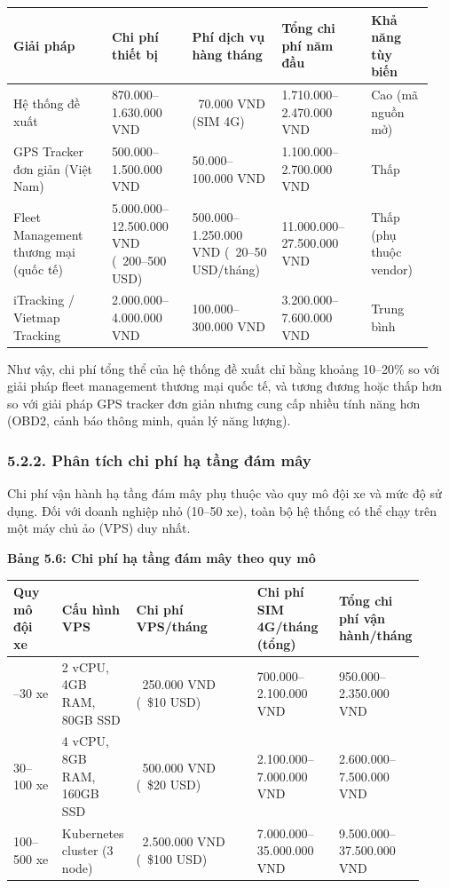 \documentclass[13pt,a4paper]{extarticle}
\newcounter{none} %
\newcommand{\thesislongtableorignewline}{}
\let\thesislongtableorignewline\\
\renewcommand{\\}{\thesislongtableorignewline\hline}%
\let\\\thesislongtableorignewline
\newcommand{\thesistabletitle}[1]{%
  \begin{center}\textbf{#1}\end{center}%
}
\begin{document}
{\def\LTcaptype{none} %
\begin{longtable}{|p{0.22\linewidth}|p{0.18\linewidth}|p{0.20\linewidth}|p{0.20\linewidth}|p{0.14\linewidth}|}
\hline \textbf{Giải pháp} & \textbf{Chi phí thiết bị} & \textbf{Phí dịch vụ hàng tháng} & \textbf{Tổng chi phí năm
đầu} & \textbf{Khả năng tùy biến} \\
\hline
\endhead
\hline
\endlastfoot
Hệ thống đề xuất & 870.000--1.630.000 VND & ~70.000 VND
(SIM 4G) & 1.710.000--2.470.000 VND & Cao (mã nguồn mở) \\
GPS Tracker đơn giản (Việt Nam) & 500.000--1.500.000 VND &
50.000--100.000 VND & 1.100.000--2.700.000 VND & Thấp \\
Fleet Management thương mại (quốc tế) & 5.000.000--12.500.000 VND
(~200--500 USD) & 500.000--1.250.000 VND
(~20--50 USD/tháng) & 11.000.000--27.500.000 VND & Thấp
(phụ thuộc vendor) \\
iTracking / Vietmap Tracking & 2.000.000--4.000.000 VND &
100.000--300.000 VND & 3.200.000--7.600.000 VND & Trung bình \\
\end{longtable}
}

Như vậy, chi phí tổng thể của hệ thống đề xuất chỉ bằng khoảng 10--20\%
so với giải pháp fleet management thương mại quốc tế, và tương đương
hoặc thấp hơn so với giải pháp GPS tracker đơn giản nhưng cung cấp nhiều
tính năng hơn (OBD2, cảnh báo thông minh, quản lý năng lượng).

\subsubsection{5.2.2. Phân tích chi phí hạ tầng đám
mây}\label{522-phuxe2n-tuxedch-chi-phuxed-hux1ea1-tux1ea7ng-ux111uxe1m-muxe2y}

Chi phí vận hành hạ tầng đám mây phụ thuộc vào quy mô đội xe và mức độ
sử dụng. Đối với doanh nghiệp nhỏ (10--50 xe), toàn bộ hệ thống có thể
chạy trên một máy chủ ảo (VPS) duy nhất.

\thesistabletitle{Bảng 5.6: Chi phí hạ tầng đám mây theo quy mô}

{\def\LTcaptype{none} %
\begin{longtable}{|p{0.12\linewidth}|p{0.10\linewidth}|p{0.30\linewidth}|p{0.20\linewidth}|p{0.20\linewidth}|}
\hline \textbf{Quy mô đội xe} & \textbf{Cấu hình VPS} & \textbf{Chi phí VPS/tháng} & \textbf{Chi phí SIM 4G/tháng
(tổng)} & \textbf{Tổng chi phí vận hành/tháng} \\
\hline
\endhead
\hline
\endlastfoot
10--30 xe & 2 vCPU, 4GB RAM, 80GB SSD & ~250.000 VND
(~\$10 USD) & 700.000--2.100.000 VND & 950.000--2.350.000
VND \\
30--100 xe & 4 vCPU, 8GB RAM, 160GB SSD & ~500.000 VND
(~\$20 USD) & 2.100.000--7.000.000 VND &
2.600.000--7.500.000 VND \\
100--500 xe & Kubernetes cluster (3 node) & ~2.500.000 VND
(~\$100 USD) & 7.000.000--35.000.000 VND &
9.500.000--37.500.000 VND \\
\end{longtable}
}
\end{document}

